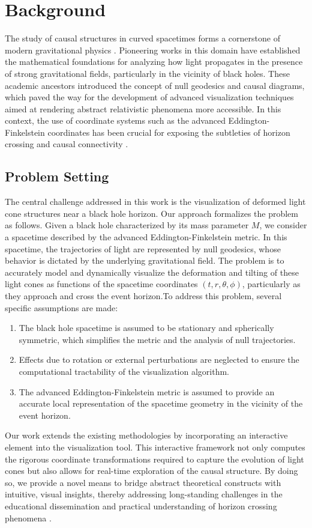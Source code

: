 \documentclass{article}
\begin{document}
\section{Background}\n \n The study of causal structures in curved spacetimes forms a cornerstone of modern gravitational physics \cite{Reference1,Reference2}. Pioneering works in this domain have established the mathematical foundations for analyzing how light propagates in the presence of strong gravitational fields, particularly in the vicinity of black holes. These academic ancestors introduced the concept of null geodesics and causal diagrams, which paved the way for the development of advanced visualization techniques aimed at rendering abstract relativistic phenomena more accessible. In this context, the use of coordinate systems such as the advanced Eddington-Finkelstein coordinates has been crucial for exposing the subtleties of horizon crossing and causal connectivity \cite{Reference3}.\n \n \subsection{Problem Setting}\n \n The central challenge addressed in this work is the visualization of deformed light cone structures near a black hole horizon. Our approach formalizes the problem as follows. Given a black hole characterized by its mass parameter $M$, we consider a spacetime described by the advanced Eddington-Finkelstein metric. In this spacetime, the trajectories of light are represented by null geodesics, whose behavior is dictated by the underlying gravitational field. The problem is to accurately model and dynamically visualize the deformation and tilting of these light cones as functions of the spacetime coordinates $(t, r, \theta, \phi)$, particularly as they approach and cross the event horizon.\n \n To address this problem, several specific assumptions are made:\n \begin{enumerate}\n   \item The black hole spacetime is assumed to be stationary and spherically symmetric, which simplifies the metric and the analysis of null trajectories.\n   \item Effects due to rotation or external perturbations are neglected to ensure the computational tractability of the visualization algorithm.\n   \item The advanced Eddington-Finkelstein metric is assumed to provide an accurate local representation of the spacetime geometry in the vicinity of the event horizon.\n \end{enumerate}\n \n Our work extends the existing methodologies by incorporating an interactive element into the visualization tool. This interactive framework not only computes the rigorous coordinate transformations required to capture the evolution of light cones but also allows for real-time exploration of the causal structure. By doing so, we provide a novel means to bridge abstract theoretical constructs with intuitive, visual insights, thereby addressing long-standing challenges in the educational dissemination and practical understanding of horizon crossing phenomena \cite{Reference4}.
\end{document}
